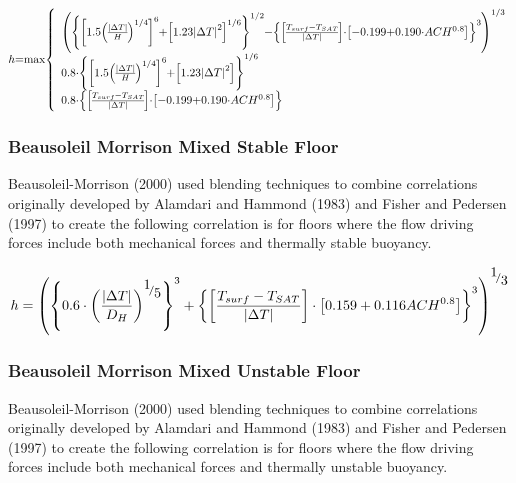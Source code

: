 \begin{equation}
\medmuskip=0mu
\thinmuskip=0mu
\thickmuskip=0mu
\nulldelimiterspace=0pt
\scriptspace=0pt
h = \max \left\{
\begin{array}{l}
\left(\left\{\left[1.5\left(\frac{\left|\Delta T\right|}{H}\right)^{1/4}\right]^6+\left[1.23\left|\Delta T\right|^2\right]^{1/6}\right\}^{1/2}-\left\{\left[\frac{T_{surf}-T_{SAT}}{\left|\Delta T\right|}\right]\cdot\left[-0.199+0.190\cdot ACH^{0.8}\right]\right\}^3\right)^{1/3} \\
0.8\cdot \left\{\left[1.5\left(\frac{\left|\Delta T\right|}{H}\right)^{1/4}\right]^6+\left[1.23\left|\Delta T\right|^2\right]\right\}^{1/6} \\
0.8\cdot \left\{\left[\frac{T_{surf}-T_{SAT}}{\left|\Delta T\right|}\right]\cdot\left[-0.199+0.190\cdot ACH^{0.8}\right]\right\}
\end{array}
\right.
\end{equation}

\subsubsection{Beausoleil Morrison Mixed Stable Floor}\label{beausoleil-morrison-mixed-stable-floor}

Beausoleil-Morrison (2000) used blending techniques to combine correlations originally developed by Alamdari and Hammond (1983) and Fisher and Pedersen (1997) to create the following correlation is for floors where the flow driving forces include both mechanical forces and thermally stable buoyancy.

\begin{equation}
h = {\left( {{{\left\{ {0.6 \cdot {{\left( {\frac{{\left| {\Delta T} \right|}}{{{D_H}}}} \right)}^{{\raise0.7ex\hbox{1} \!\mathord{\left/ {\vphantom {1 5}}\right.}\!\lower0.7ex\hbox{5}}}}} \right\}}^3} + {{\left\{ {\left[ {\frac{{{T_{surf}} - {T_{SAT}}}}{{\left| {\Delta T} \right|}}} \right]\cdot\left[ {0.159 + 0.116AC{H^{0.8}}} \right]} \right\}}^3}} \right)^{{\raise0.7ex\hbox{1} \!\mathord{\left/ {\vphantom {1 3}}\right.}\!\lower0.7ex\hbox{3}}}}
\end{equation}

\subsubsection{Beausoleil Morrison Mixed Unstable Floor}\label{beausoleil-morrison-mixed-unstable-floor}

Beausoleil-Morrison (2000) used blending techniques to combine correlations originally developed by Alamdari and Hammond (1983) and Fisher and Pedersen (1997) to create the following correlation is for floors where the flow driving forces include both mechanical forces and thermally unstable buoyancy.

